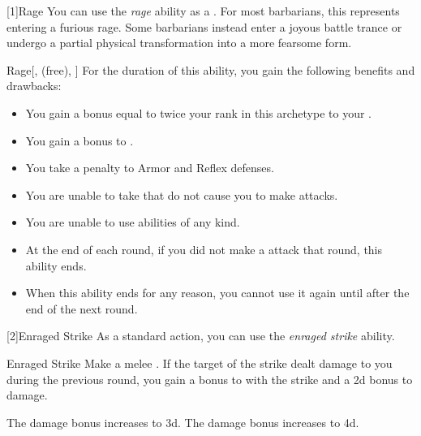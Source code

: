         [1]{Rage} You can use the \textit{rage} ability as a .
        For most barbarians, this represents entering a furious rage.
        Some barbarians instead enter a joyous battle trance or undergo a partial physical transformation into a more fearsome form.
        \begin{attuneability}{Rage}[,  (free), ]
            For the duration of this ability, you gain the following benefits and drawbacks:
            \begin{itemize}
                \item You gain a bonus equal to twice your rank in this archetype to your  .
                \item You gain a  bonus to .
                \item You take a  penalty to Armor and Reflex defenses.
                \item You are unable to take  that do not cause you to make  attacks.
                \item You are unable to use  abilities of any kind.
                \item At the end of each round, if you did not make a  attack that round, this ability ends.
                \item When this ability ends for any reason, you cannot use it again until after the end of the next round.
            \end{itemize}
        \end{attuneability}

        [2]{Enraged Strike} As a standard action, you can use the \textit{enraged strike} ability.
        \begin{freeability}{Enraged Strike}
            Make a melee .
            If the target of the strike dealt damage to you during the previous round, you gain a  bonus to  with the strike and a \plus2d bonus to damage.

            \rankline
             The damage bonus increases to \plus3d.
             The damage bonus increases to \plus4d.
        \end{freeability}

